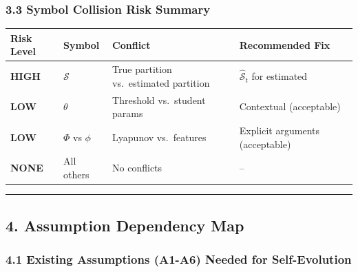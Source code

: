 \documentclass[
  12pt,
]{article}
\begin{document}
\subsubsection{3.3 Symbol Collision Risk
Summary}\label{symbol-collision-risk-summary}

\begin{longtable}[]{@{}
  >{\raggedright\arraybackslash}p{}
  >{\raggedright\arraybackslash}p{}
  >{\raggedright\arraybackslash}p{}
  >{\raggedright\arraybackslash}p{}@{}}
\toprule\noalign{}
\begin{minipage}[b]{\linewidth}\raggedright
Risk Level
\end{minipage} & \begin{minipage}[b]{\linewidth}\raggedright
Symbol
\end{minipage} & \begin{minipage}[b]{\linewidth}\raggedright
Conflict
\end{minipage} & \begin{minipage}[b]{\linewidth}\raggedright
Recommended Fix
\end{minipage} \\
\midrule\noalign{}
\endhead
\bottomrule\noalign{}
\endlastfoot
\textbf{HIGH} & \(\mathcal{S}\) & True partition vs.~estimated partition
& \(\hat{\mathcal{S}}_t\) for estimated \\
\textbf{LOW} & \(\theta\) & Threshold vs.~student params & Contextual
(acceptable) \\
\textbf{LOW} & \(\Phi\) vs \(\phi\) & Lyapunov vs.~features & Explicit
arguments (acceptable) \\
\textbf{NONE} & All others & No conflicts & -- \\
\end{longtable}

\begin{center}\rule{0.5\linewidth}{0.5pt}\end{center}

\subsection{4. Assumption Dependency
Map}\label{assumption-dependency-map}

\subsubsection{4.1 Existing Assumptions (A1-A6) Needed for
Self-Evolution}\label{existing-assumptions-a1-a6-needed-for-self-evolution}
\end{document}
